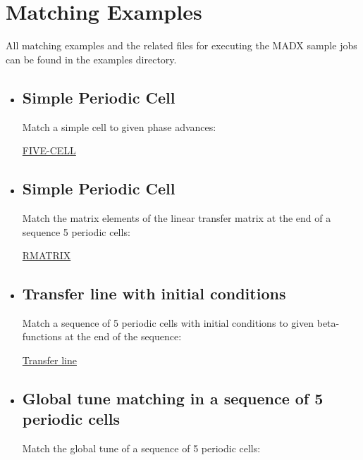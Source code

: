  
\section{Matching Examples}

All matching examples and the related files for executing the MADX sample jobs can be found in the examples directory. 
\begin{itemize}
	\item \subsection{Simple Periodic Cell} 
	Match a simple cell to given phase advances: 

\href{http://cern.ch/madx/madX/examples/match/5cell/job.5cell.madx}{FIVE-CELL}

	\item \subsection{Simple Periodic Cell}
	Match the matrix elements of the linear transfer matrix at the end of a sequence 5 periodic cells: 

\href{http://cern.ch/madx/madX/examples/match/r-matrix/job.r-matrix.madx}{RMATRIX}

	\item \subsection{Transfer line with initial conditions}
	Match a sequence of 5 periodic cells with initial conditions  to given beta-functions at the end of the sequence: 

\href{http://cern.ch/madx/madX/examples/match/line/job.line.madx}{Transfer line}

	\item \subsection{Global tune matching in a sequence of 5 periodic cells}
	Match the global tune of a sequence of 5 periodic cells: 


\end{itemize}
